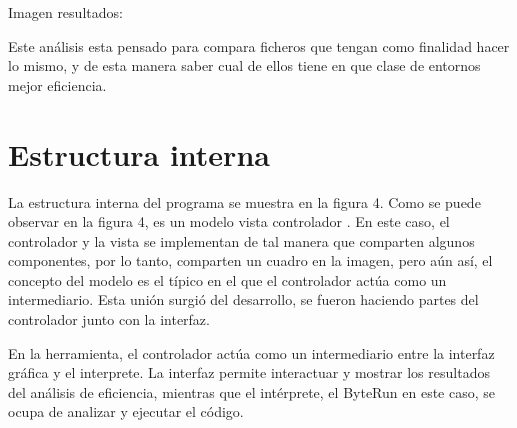 Imagen resultados:

Este análisis esta pensado para compara ficheros que tengan como finalidad hacer lo mismo, y de esta manera saber cual de ellos tiene en que clase de entornos mejor eficiencia.

\section{Estructura interna}


La estructura interna del programa se muestra en la figura 4. Como se puede observar en la figura 4, es un modelo vista controlador . En este caso, el controlador y la vista se implementan de tal manera que comparten algunos componentes, por lo tanto, comparten un cuadro en la imagen, pero aún así, el concepto del modelo es el típico en el que el controlador actúa como un intermediario. Esta unión surgió del desarrollo, se fueron haciendo partes del controlador junto con la interfaz.

En la herramienta, el controlador actúa como un intermediario entre la interfaz gráfica y el interprete. La interfaz permite interactuar y mostrar los resultados del análisis de eficiencia, mientras que el intérprete, el ByteRun en este caso, se ocupa de analizar y ejecutar el código.


